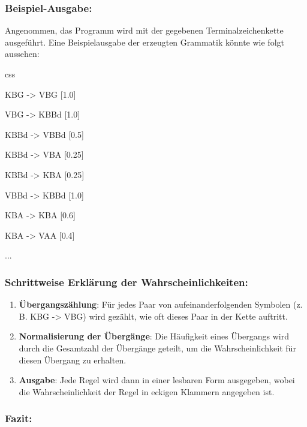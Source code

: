 \documentclass[
]{article}
\begin{document}
\subsubsection{\texorpdfstring{\textbf{Beispiel-Ausgabe:}}{Beispiel-Ausgabe:}}\label{beispiel-ausgabe}

Angenommen, das Programm wird mit der gegebenen Terminalzeichenkette
ausgeführt. Eine Beispielausgabe der erzeugten Grammatik könnte wie
folgt aussehen:

css

KBG -\textgreater{} VBG {[}1.0{]}

VBG -\textgreater{} KBBd {[}1.0{]}

KBBd -\textgreater{} VBBd {[}0.5{]}

KBBd -\textgreater{} VBA {[}0.25{]}

KBBd -\textgreater{} KBA {[}0.25{]}

VBBd -\textgreater{} KBBd {[}1.0{]}

KBA -\textgreater{} KBA {[}0.6{]}

KBA -\textgreater{} VAA {[}0.4{]}

...

\subsubsection{\texorpdfstring{\textbf{Schrittweise Erklärung der
Wahrscheinlichkeiten:}}{Schrittweise Erklärung der Wahrscheinlichkeiten:}}\label{schrittweise-erkluxe4rung-der-wahrscheinlichkeiten}

\begin{enumerate}
\def\labelenumi{\arabic{enumi}.}
\item
  \textbf{Übergangszählung}: Für jedes Paar von aufeinanderfolgenden
  Symbolen (z. B. KBG -\textgreater{} VBG) wird gezählt, wie oft dieses
  Paar in der Kette auftritt.
\item
  \textbf{Normalisierung der Übergänge}: Die Häufigkeit eines Übergangs
  wird durch die Gesamtzahl der Übergänge geteilt, um die
  Wahrscheinlichkeit für diesen Übergang zu erhalten.
\item
  \textbf{Ausgabe}: Jede Regel wird dann in einer lesbaren Form
  ausgegeben, wobei die Wahrscheinlichkeit der Regel in eckigen Klammern
  angegeben ist.
\end{enumerate}

\subsubsection{\texorpdfstring{\textbf{Fazit:}}{Fazit:}}\label{fazit-1}
\end{document}
